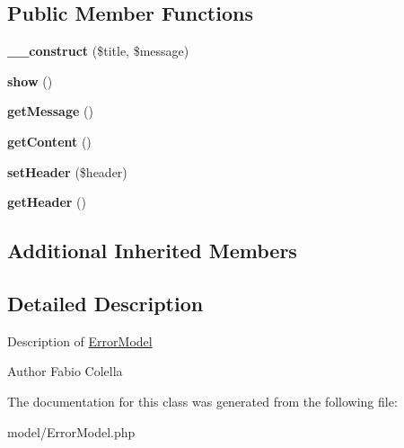 \subsection*{Public Member Functions}
\begin{DoxyCompactItemize}
\item 
\hypertarget{classErrorModel_abceb91bb8d66809f1016c685fff3b281}{{\bfseries \+\_\+\+\_\+construct} (\$title, \$message)}\label{classErrorModel_abceb91bb8d66809f1016c685fff3b281}

\item 
\hypertarget{classErrorModel_af4f6e8ad91bdff9b86769ad4ea01f7f5}{{\bfseries show} ()}\label{classErrorModel_af4f6e8ad91bdff9b86769ad4ea01f7f5}

\item 
\hypertarget{classErrorModel_a01701980e78f4d77cdf11e88e4506507}{{\bfseries get\+Message} ()}\label{classErrorModel_a01701980e78f4d77cdf11e88e4506507}

\item 
\hypertarget{classErrorModel_a1bb43423f160f44504fbbc9750f47087}{{\bfseries get\+Content} ()}\label{classErrorModel_a1bb43423f160f44504fbbc9750f47087}

\item 
\hypertarget{classErrorModel_a8d3bc764cfde8e9f70d13f91796e1621}{{\bfseries set\+Header} (\$header)}\label{classErrorModel_a8d3bc764cfde8e9f70d13f91796e1621}

\item 
\hypertarget{classErrorModel_a1fd5e86a80a654f464811fde25b5928f}{{\bfseries get\+Header} ()}\label{classErrorModel_a1fd5e86a80a654f464811fde25b5928f}

\end{DoxyCompactItemize}
\subsection*{Additional Inherited Members}


\subsection{Detailed Description}
Description of \hyperlink{classErrorModel}{Error\+Model}

\begin{DoxyAuthor}{Author}
Fabio Colella 
\end{DoxyAuthor}


The documentation for this class was generated from the following file\+:\begin{DoxyCompactItemize}
\item 
model/Error\+Model.\+php\end{DoxyCompactItemize}
